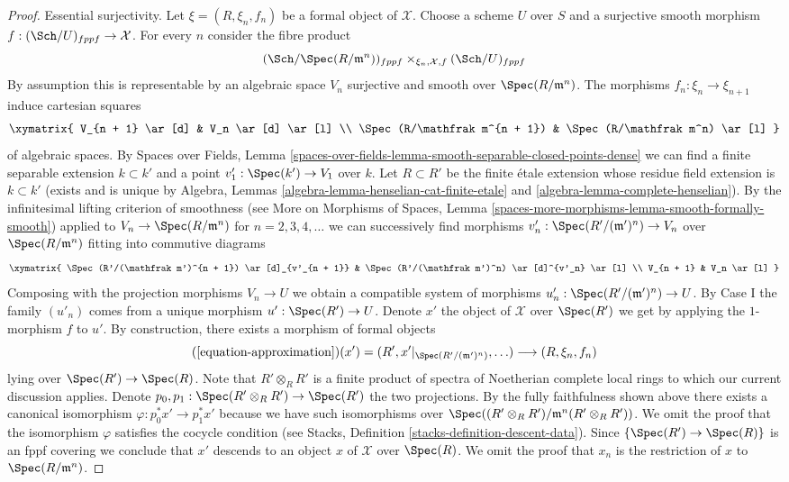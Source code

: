\begin{proof}
\medskip\noindent
Essential surjectivity. Let $\xi = (R, \xi_n, f_n)$ be a formal object of
$\mathcal{X}$. Choose a scheme $U$ over $S$ and a surjective smooth morphism
$f : (\Sch/U)_{fppf} \to \mathcal{X}$. For every $n$ consider the fibre product
$$
(\Sch/\Spec(R/\mathfrak m^n))_{fppf}
\times_{\xi_n, \mathcal{X}, f}
(\Sch/U)_{fppf}
$$
By assumption this is representable by an algebraic space $V_n$ surjective and
smooth over $\Spec(R/\mathfrak m^n)$. The morphisms
$f_n : \xi_n \to \xi_{n + 1}$ induce cartesian squares
$$
\xymatrix{
V_{n + 1} \ar[d] & V_n \ar[d] \ar[l] \\
\Spec(R/\mathfrak m^{n + 1}) & \Spec(R/\mathfrak m^n) \ar[l]
}
$$
of algebraic spaces. By Spaces over Fields, Lemma
\ref{spaces-over-fields-lemma-smooth-separable-closed-points-dense}
we can find a finite separable extension $k \subset k'$ and a point
$v'_1 : \Spec(k') \to V_1$ over $k$. Let $R \subset R'$ be the finite \'etale
extension whose residue field extension is $k \subset k'$ (exists and
is unique by
Algebra, Lemmas \ref{algebra-lemma-henselian-cat-finite-etale} and
\ref{algebra-lemma-complete-henselian}).
By the infinitesimal lifting criterion of smoothness (see
More on Morphisms of Spaces, Lemma
\ref{spaces-more-morphisms-lemma-smooth-formally-smooth})
applied to $V_n \to \Spec(R/\mathfrak m^n)$ for $n = 2, 3, 4, \ldots$
we can successively find morphisms
$v'_n : \Spec(R'/(\mathfrak m')^n) \to V_n$ over $\Spec(R/\mathfrak m^n)$
fitting into commutive diagrams
$$
\xymatrix{
\Spec(R'/(\mathfrak m')^{n + 1}) \ar[d]_{v'_{n + 1}} &
\Spec(R'/(\mathfrak m')^n) \ar[d]^{v'_n} \ar[l] \\
V_{n + 1} & V_n \ar[l]
}
$$
Composing with the projection morphisms $V_n \to U$ we obtain a compatible
system of morphisms $u'_n : \Spec(R'/(\mathfrak m')^n) \to U$.
By Case I the family $(u'_n)$ comes from a unique
morphism $u' : \Spec(R') \to U$. Denote $x'$ the object of $\mathcal{X}$
over $\Spec(R')$ we get by applying the $1$-morphism $f$ to $u'$.
By construction, there exists a morphism of formal objects
$$
(\ref{equation-approximation})(x') =
(R', x'|_{\Spec(R'/(\mathfrak m')^n)}, \ldots)
\longrightarrow
(R, \xi_n, f_n)
$$
lying over $\Spec(R') \to \Spec(R)$. Note that $R' \otimes_R R'$ is a finite
product of spectra of Noetherian complete local rings to which our current
discussion applies. Denote $p_0, p_1 : \Spec(R' \otimes_R R') \to \Spec(R')$
the two projections. By the fully faithfulness shown above there exists
a canonical isomorphism $\varphi : p_0^*x' \to p_1^*x'$ because we have
such isomorphisms over
$\Spec((R' \otimes_R R')/\mathfrak m^n(R' \otimes_R R'))$.
We omit the proof that the isomorphism $\varphi$ satisfies the cocycle
condition (see Stacks, Definition \ref{stacks-definition-descent-data}).
Since $\{\Spec(R') \to \Spec(R)\}$ is an fppf covering we conclude
that $x'$ descends to an object $x$ of $\mathcal{X}$ over $\Spec(R)$.
We omit the proof that $x_n$ is the restriction of $x$ to
$\Spec(R/\mathfrak m^n)$.
\end{proof}

